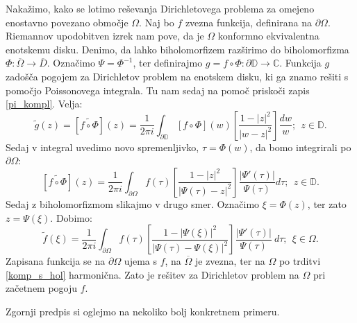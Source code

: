 \documentclass[mat1]{fmfdelo}
\begin{document}
    Nakažimo, kako se lotimo reševanja Dirichletovega problema za omejeno enostavno povezano območje $\Omega$. Naj bo $f$ zvezna funkcija, definirana na $\partial \Omega$. 
    Riemannov upodobitven izrek nam pove, da je $\Omega$ konformno ekvivalentna enotskemu disku. Denimo, da lahko biholomorfizem razširimo do biholomorfizma $\Phi: \overline{\Omega} \to \overline{D}$. 
    Označimo $\Psi = \Phi^{-1}$, ter definirajmo $g = f \circ \Phi: \partial \mathbb{D} \to \mathbb{C}$. Funkcija $g$ zadošča pogojem za Dirichletov problem na enotskem disku, ki ga znamo rešiti s pomočjo Poissonovega integrala. 
    Tu nam sedaj na pomoč priskoči zapis \eqref{pi_kompl}. Velja:
    $$
    \widetilde{g}(z) = [\widetilde{f \circ \Phi}](z) = \frac{1}{2\pi i}\int_{\partial \mathbb{D}}{[f \circ \Phi](w) \left[\frac{1 - |z|^2}{|w - z|^2}\right]\frac{dw}{w}};~~z \in \mathbb{D}. 
    $$
    Sedaj v integral uvedimo novo spremenljivko, $\tau = \Phi(w)$, da bomo integrirali po $\partial \Omega$: 
    $$
    [\widetilde{f \circ \Phi}](z) = \frac{1}{2\pi i}\int_{\partial \Omega}{f(\tau) \left[\frac{1 - |z|^2}{|\Psi(\tau) - z|^2}\right]\frac{|\Psi'(\tau)|}{\Psi(\tau)}d \tau};~~z \in \mathbb{D}. 
    $$
    Sedaj z biholomorfizmom slikajmo v drugo smer. Označimo $\xi = \Phi(z)$, ter zato $z = \Psi(\xi)$. Dobimo:
    \begin{equation}
        \label{eno_pov_obm}
    \widetilde{f}(\xi) = \frac{1}{2\pi i}\int_{\partial \Omega}{f(\tau) \left[\frac{1 - |\Psi(\xi)|^2}{|\Psi(\tau) - \Psi(\xi)|^2}\right]\frac{|\Psi'(\tau)|}{\Psi(\tau)}~d \tau};~~\xi \in \Omega. 
    \end{equation}
    Zapisana funkcija se na $\partial \Omega$ ujema s $f$, na $\overline{\Omega}$ je zvezna, ter na $\Omega$ po trditvi \ref{komp_s_hol} harmonična. Zato je rešitev za Dirichletov problem na $\Omega$ pri začetnem pogoju $f$.

    Zgornji predpis si oglejmo na nekoliko bolj konkretnem primeru. 
    
\end{document}
